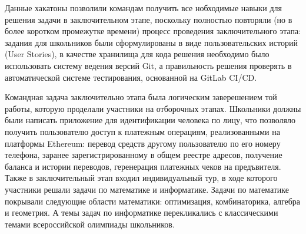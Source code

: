 Данные хакатоны позволили командам получить все нобходимые навыки для
решения задачи в заключительном этапе, поскольку полностью повторяли
(но в более коротком промежутке времени) процесс проведения
заключительного этапа: задания для школьников были сформулированы в
виде пользовательских историй (User Stories), в качестве хранилища
для кода решения необходимо было использовать систему ведения версий
Git, а правильность решения проверять в автоматической системе
тестирования, основанной на GitLab CI/CD.

Командная задача заключительно этапа была логическим заверешением той
работы, которую проделали участники на отборочных этапах. Школьники
должны были написать приложение для идентификации человека по лицу,
что позволяло получить пользователю доступ к платежным операциям,
реализованными на платформы Ethereum: перевод средств другому
пользователю по его номеру телефона, заранее зарегистрированному в
общем реестре адресов, получение баланса и истории переводов,
геренерация платежных чеков на предъвителя. Также в заключительный
этап входил индивидуальный тур, в ходе которого участники решали
задачи по математике и информатике. Задачи по математике покрывали
следующие области математики: оптимизация, комбинаторика, алгебра и
геометрия. А темы задач по информатике перекликались с классическими
темами всероссийской олимпиады школьников.